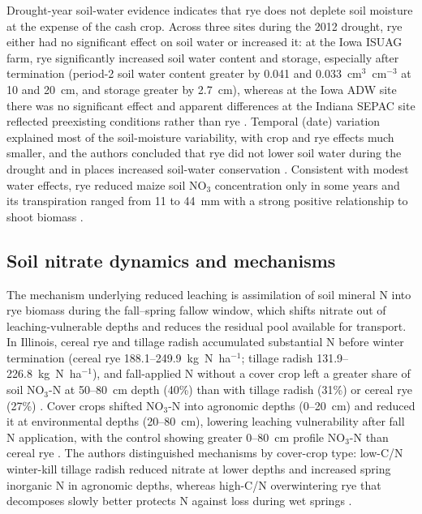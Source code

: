 \documentclass[11pt]{article}
\begin{document}
Drought-year soil-water evidence indicates that rye does not deplete soil moisture at the expense of the cash crop. Across three sites during the 2012 drought, rye either had no significant effect on soil water or increased it: at the Iowa ISUAG farm, rye significantly increased soil water content and storage, especially after termination (period-2 soil water content greater by 0.041 and 0.033~cm$^3$~cm$^{-3}$ at 10 and 20~cm, and storage greater by 2.7~cm), whereas at the Iowa ADW site there was no significant effect and apparent differences at the Indiana SEPAC site reflected preexisting conditions rather than rye \parencite{Daigh2014b}. Temporal (date) variation explained most of the soil-moisture variability, with crop and rye effects much smaller, and the authors concluded that rye did not lower soil water during the drought and in places increased soil-water conservation \parencite{Daigh2014b}. Consistent with modest water effects, rye reduced maize soil NO$_3$ concentration only in some years and its transpiration ranged from 11 to 44~mm with a strong positive relationship to shoot biomass \parencite{MartinezFeria2016}.

\subsection{Soil nitrate dynamics and mechanisms}
The mechanism underlying reduced leaching is assimilation of soil mineral N into rye biomass during the fall--spring fallow window, which shifts nitrate out of leaching-vulnerable depths and reduces the residual pool available for transport. In Illinois, cereal rye and tillage radish accumulated substantial N before winter termination (cereal rye 188.1--249.9~kg~N~ha$^{-1}$; tillage radish 131.9--226.8~kg~N~ha$^{-1}$), and fall-applied N without a cover crop left a greater share of soil NO$_3$-N at 50--80~cm depth (40\%) than with tillage radish (31\%) or cereal rye (27\%) \parencite{Lacey2015}. Cover crops shifted NO$_3$-N into agronomic depths (0--20~cm) and reduced it at environmental depths (20--80~cm), lowering leaching vulnerability after fall N application, with the control showing greater 0--80~cm profile NO$_3$-N than cereal rye \parencite{Lacey2015}. The authors distinguished mechanisms by cover-crop type: low-C/N winter-kill tillage radish reduced nitrate at lower depths and increased spring inorganic N in agronomic depths, whereas high-C/N overwintering rye that decomposes slowly better protects N against loss during wet springs \parencite{Lacey2015}.
\end{document}
